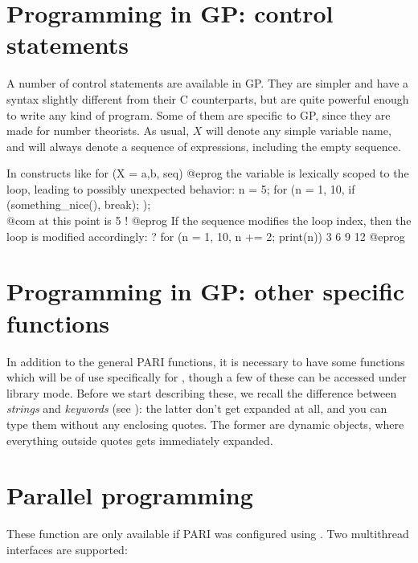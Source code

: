 \section{Programming in GP: control statements}
\label{se:programming}

  A number of control statements are available in GP. They are simpler and
have a syntax slightly different from their C counterparts, but are quite
powerful enough to write any kind of program. Some of them are specific to
GP, since they are made for number theorists. As usual, $X$ will denote any
simple variable name, and  will always denote a sequence of
expressions, including the empty sequence.

 In constructs like
\bprog
    for (X = a,b, seq)
@eprog\noindent
the variable  is lexically scoped to the loop, leading to possibly
unexpected behavior:
\bprog
    n = 5;
    for (n = 1, 10,
      if (something_nice(), break);
    );
    \\ @com at this point  is 5 !
@eprog\noindent
If the sequence  modifies the loop index, then the loop
is modified accordingly:
\bprog
    ? for (n = 1, 10, n += 2; print(n))
    3
    6
    9
    12
@eprog


\section{Programming in GP: other specific functions}
\label{se:gp_program}

  In addition to the general PARI functions, it is necessary to have some
functions which will be of use specifically for , though a few of these can
be accessed under library mode. Before we start describing these, we recall
the difference between \emph{strings} and \emph{keywords} (see
): the latter don't get expanded at all, and you can type
them without any enclosing quotes. The former are dynamic objects, where
everything outside quotes gets immediately expanded.


\section{Parallel programming}

These function are only available if PARI was configured using
. Two multithread interfaces are supported:

